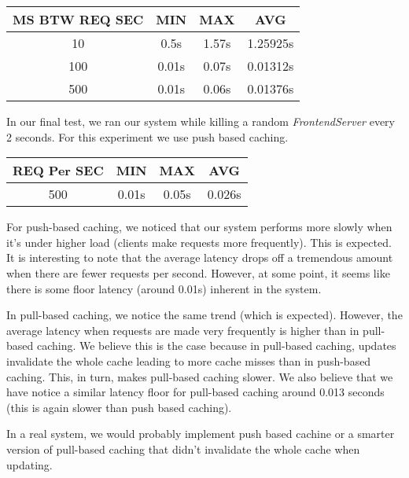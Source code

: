 \documentclass[11pt]{article}
\begin{document}
\begin{tabular}{c|c|c|c}
  MS BTW REQ SEC & MIN & MAX & AVG \\
  \hline
  10  & 0.5s  & 1.57s & 1.25925s \\
  100 & 0.01s & 0.07s & 0.01312s \\
  500 & 0.01s & 0.06s & 0.01376s \\
\end{tabular}

In our final test, we ran our system while killing a random
\emph{FrontendServer} every 2 seconds.  For this experiment we use
push based caching.

\begin{tabular}{c|c|c|c}
  REQ Per SEC & MIN & MAX & AVG \\
  \hline
  500  & 0.01s  & 0.05s & 0.026s \\
\end{tabular}

For push-based caching, we noticed that our system performs more
slowly when it's under higher load (clients make requests more
frequently).  This is expected.  It is interesting to note that the
average latency drops off a tremendous amount when there are fewer
requests per second.  However, at some point, it seems like there is some
floor latency (around 0.01s) inherent in the system.

In pull-based caching, we notice the same trend (which is expected).
However, the average latency when requests are made very
frequently is higher than in pull-based caching.  We believe this is
the case because in pull-based caching, updates invalidate the whole
cache leading to more cache misses than in push-based caching.  This,
in turn, makes pull-based caching slower.  We also believe that we
have notice a similar latency floor for pull-based caching around
0.013 seconds (this is again slower than push based caching).

In a real system, we would probably implement push based cachine or a
smarter version of pull-based caching that didn't invalidate the whole
cache when updating.

\end{document}
